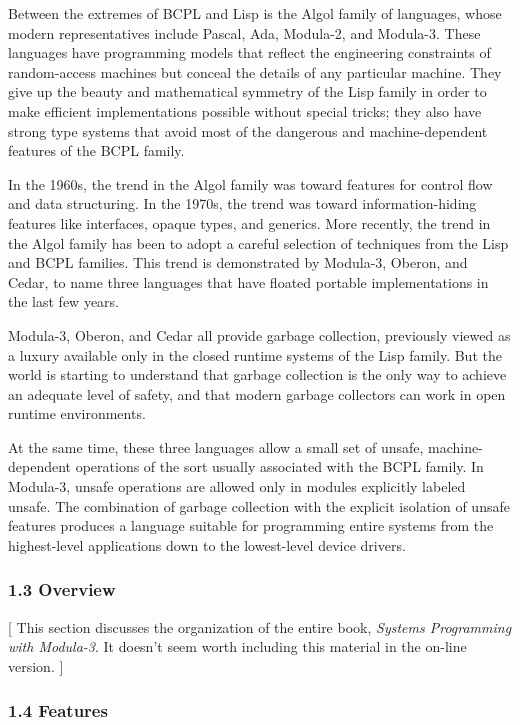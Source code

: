 \documentclass[10pt]{article}
\begin{document}
Between the extremes of BCPL and Lisp is the Algol family of languages, whose
modern representatives include Pascal, Ada, Modula-2, and Modula-3.  These
languages have programming models that reflect the engineering constraints of
random-access machines but conceal the details of any particular machine.
They give up the beauty and mathematical symmetry of the Lisp family in order
to make efficient implementations possible without special tricks; they also
have strong type systems that avoid most of the dangerous and
machine-dependent features of the BCPL family.

In the 1960s, the trend in the Algol family was toward features for control
flow and data structuring.  In the 1970s, the trend was toward
information-hiding features like interfaces, opaque types, and generics.  More
recently, the trend in the Algol family has been to adopt a careful selection
of techniques from the Lisp and BCPL families.  This trend is demonstrated by
Modula-3, Oberon, and Cedar, to name three languages that have floated
portable implementations in the last few years.

Modula-3, Oberon, and Cedar all provide garbage collection, previously viewed
as a luxury available only in the closed runtime systems of the Lisp family.
But the world is starting to understand that garbage collection is the only
way to achieve an adequate level of safety, and that modern garbage collectors
can work in open runtime environments.

At the same time, these three languages allow a small set of unsafe,
machine-dependent operations of the sort usually associated with the BCPL
family.  In Modula-3, unsafe operations are allowed only in modules explicitly
labeled unsafe.  The combination of garbage collection with the explicit
isolation of unsafe features produces a language suitable for programming
entire systems from the highest-level applications down to the lowest-level
device drivers.

\subsubsection*{1.3 Overview}

[ This section discusses the organization of the entire book, \emph{Systems
  Programming with Modula-3}.  It doesn't seem worth including this material
in the on-line version. ]

\subsubsection*{1.4 Features}
\end{document}
